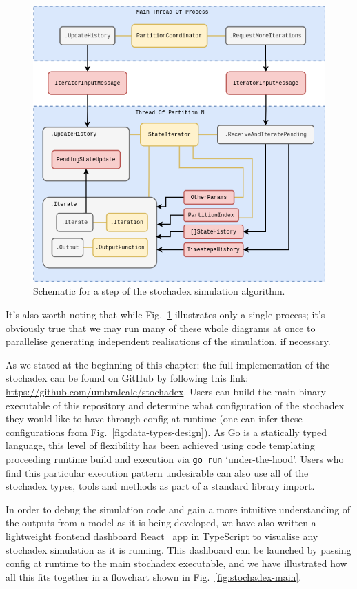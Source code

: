 \begin{figure}[h]
\centering
\includegraphics[width=13cm]{images/chapter-1-stochadex-loop.drawio.png}
\caption{Schematic for a step of the stochadex simulation algorithm.}
\label{fig:loop-design}
\end{figure}

It's also worth noting that while Fig.~\ref{fig:loop-design} illustrates only a single process; it's obviously true that we may run many of these whole diagrams at once to parallelise generating independent realisations of the simulation, if necessary.

As we stated at the beginning of this chapter: the full implementation of the stochadex can be found on GitHub by following this link: \href{https://github.com/umbralcalc/stochadex}{https://github.com/umbralcalc/stochadex}. Users can build the main binary executable of this repository and determine what configuration of the stochadex they would like to have through config at runtime (one can infer these configurations from Fig.~\ref{fig:data-types-design}). As Go is a statically typed language, this level of flexibility has been achieved using code templating proceeding runtime build and execution via \texttt{go run} `under-the-hood'. Users who find this particular execution pattern undesirable can also use all of the stochadex types, tools and methods as part of a standard library import.

In order to debug the simulation code and gain a more intuitive understanding of the outputs from a model as it is being developed, we have also written a lightweight frontend dashboard React~\cite{react} app in TypeScript to visualise any stochadex simulation as it is running. This dashboard can be launched by passing config at runtime to the main stochadex executable, and we have illustrated how all this fits together in a flowchart shown in Fig.~\ref{fig:stochadex-main}.

